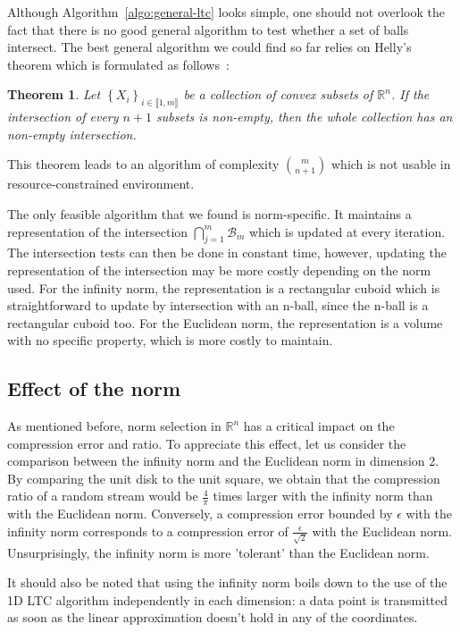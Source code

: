 \documentclass[10pt, conference, compsocconf]{IEEEtran}
\newcommand{\todo}[1]{\marginpar{\parbox{18mm}{\flushleft\tiny\color{red}\textbf{TODO}:
      #1}}}
\newtheorem*{theorem}{Theorem}
\begin{document}
Although Algorithm~\ref{algo:general-ltc} looks simple, one should not
overlook the fact that there is no good general algorithm to test
whether a set of balls intersect. The best general algorithm we could find
so far relies on Helly's theorem which is formulated as follows~\cite{helly1923mengen}:
\begin{theorem}
Let $\left\{ X_i \right\}_{i \in \llbracket 1, m \rrbracket}$ be a collection of convex subsets of $\mathbb{R}^n$. If the intersection of every $n+1$
subsets is non-empty, then the whole collection has an non-empty intersection.
\end{theorem}
This theorem leads to an algorithm of complexity ${m \choose n+1}$ which is
not usable in resource-constrained environment.

The only feasible algorithm that we found is norm-specific. It
maintains a representation of the intersection
$\bigcap_{j=1}^{m}{\mathcal{B}_m}$ which is updated at every iteration.
The intersection tests can then be done in constant time, however,
updating the representation of the intersection may be more costly
depending on the norm used. For the infinity norm, the representation
is a rectangular cuboid which is straightforward to update by
intersection with an n-ball, since the n-ball is a rectangular cuboid too.
For the Euclidean norm, the representation is a volume with no specific property,
which is more costly to maintain.

\subsection{Effect of the norm}

As mentioned before, norm selection in $\mathbb{R}^n$ has a critical
impact on the compression error and ratio. To appreciate this effect,
let us consider the comparison between the infinity norm and the
Euclidean norm in dimension 2. By comparing the unit disk to the unit
square, we obtain that the compression ratio of a random stream would
be $\frac{4}{\pi}$ times larger with the infinity norm than with the
Euclidean norm. Conversely, a compression error bounded by $\epsilon$
with the infinity norm corresponds to a compression error of
$\frac{\epsilon}{\sqrt{2}}$ with the Euclidean norm. Unsurprisingly, the
infinity norm is more 'tolerant' than the Euclidean norm.

\todo{Perhaps add a figure}

It should also be noted that using the infinity norm boils down to the
use of the 1D LTC algorithm independently in each dimension: a data
point is transmitted as soon as the linear approximation doesn't hold
in any of the coordinates. \todo{This is unclear}
\end{document}
